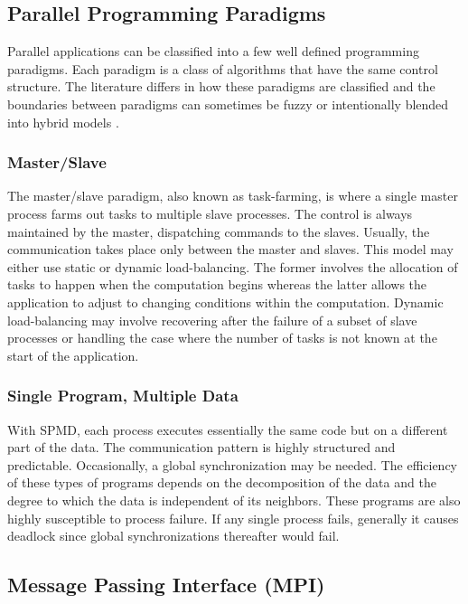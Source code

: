 \documentclass{sigplanconf}
\begin{document}
\subsection{Parallel Programming Paradigms}

Parallel applications can be classified into a few well defined programming
paradigms. Each paradigm is a class of algorithms that have the same control
structure. The literature differs in how these paradigms are classified and
the boundaries between paradigms can sometimes be fuzzy or intentionally
blended into hybrid models \cite{Buy99}. 

\subsubsection{Master/Slave}

The master/slave paradigm, also known as task-farming, is where a single
master process farms out tasks to multiple slave processes. The control is
always maintained by the master, dispatching commands to the slaves. Usually,
the communication takes place only between the master and slaves. This model
may either use static or dynamic load-balancing. The former involves the
allocation of tasks to happen when the computation begins whereas the latter
allows the application to adjust to changing conditions within the
computation. Dynamic load-balancing may involve recovering after the failure
of a subset of slave processes or handling the case where the number of tasks
is not known at the start of the application.

\subsubsection{Single Program, Multiple Data}

With SPMD, each process executes essentially the same code but on a different
part of the data. The communication pattern is highly structured and
predictable.  Occasionally, a global synchronization may be needed. The
efficiency of these types of programs depends on the decomposition of the data
and the degree to which the data is independent of its neighbors. These
programs are also highly susceptible to process failure.  If any single
process fails, generally it causes deadlock since global synchronizations
thereafter would fail.

\subsection{Message Passing Interface (MPI)}
\end{document}
